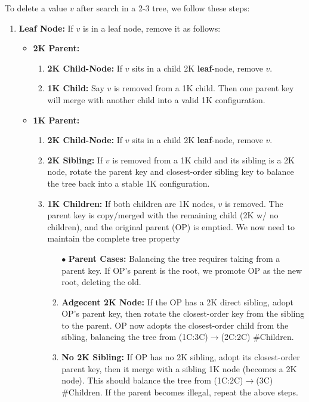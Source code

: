 \begin{Def}

\label{def:2-3_tree_delete}

To delete a value $v$ after search in a 2-3 tree, we follow these steps:
    \begin{enumerate}
        \item \textbf{Leaf Node:} If $v$ is in a leaf node, remove it as follows:
        \begin{itemize}
            \item \textbf{2K Parent:}
            \begin{enumerate}
            \item \textbf{2K Child-Node:} If $v$ sits in a child 2K \textbf{leaf}-node, remove $v$.
            \item \textbf{1K Child:} Say $v$ is removed from a 1K child. Then
            one parent key will merge with another child into a valid 1K configuration.
            \end{enumerate}

            \item \textbf{1K Parent:}
            \begin{enumerate}
            \item \textbf{2K Child-Node:} If $v$ sits in a child 2K \textbf{leaf}-node, remove $v$.
            \item \textbf{2K Sibling:} If $v$ is removed from a 1K child and its sibling is a 2K node, rotate the parent key and closest-order sibling key to
            balance the tree back into a stable 1K configuration.
            \item \textbf{1K Children:} If both children are 1K nodes, $v$ is removed. The parent key is copy/merged with the remaining
            child (2K w/ no children), and the original parent (OP) is emptied. We now need to maintain the complete tree property
            
            \begin{enumerate}
                \item [$\bullet$] \textbf{Parent Cases:} Balancing the tree requires taking from a parent key. If OP's parent is the root, 
                we promote OP as the new root, deleting the old. 
                \item \textbf{Adgecent 2K Node:} If the OP has a 2K direct sibling, adopt OP's parent key, then
                rotate the closest-order key from the sibling to the parent. OP now adopts the closest-order 
                child from the sibling, balancing the tree from (1C:3C)$\to$(2C:2C) \#Children.
                \item \textbf{No 2K Sibling:} If OP has no 2K sibling, adopt its closest-order parent key, then it merge with a sibling 1K node (becomes a 2K node).
                This should balance the tree from (1C:2C)$\to$(3C) \#Children. If the parent becomes illegal, repeat the above steps.
            \end{enumerate}
        \end{enumerate}
        

\end{itemize}
\end{enumerate}
\end{Def}
